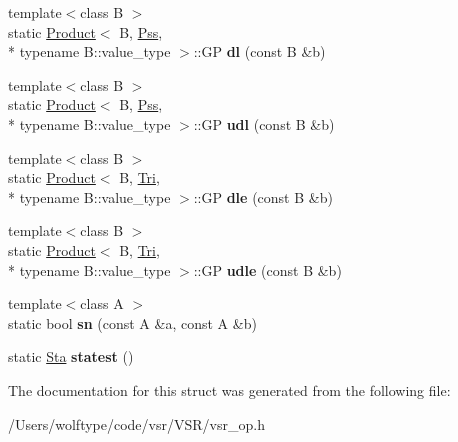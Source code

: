 \begin{DoxyCompactItemize}
\item 
\hypertarget{structvsr_1_1_op_a380263c269adfe2594918b25c3c9cd2c}{{\footnotesize template$<$class B $>$ }\\static \hyperlink{structvsr_1_1_product}{Product}$<$ B, \hyperlink{namespacevsr_ac1470327d90abc4d29ce338b597f4380}{Pss}, \\*
typename B\-::value\-\_\-type $>$\-::G\-P {\bfseries dl} (const B \&b)}\label{structvsr_1_1_op_a380263c269adfe2594918b25c3c9cd2c}

\item 
\hypertarget{structvsr_1_1_op_a43890380a85625a7e080cca922e43b23}{{\footnotesize template$<$class B $>$ }\\static \hyperlink{structvsr_1_1_product}{Product}$<$ B, \hyperlink{namespacevsr_ac1470327d90abc4d29ce338b597f4380}{Pss}, \\*
typename B\-::value\-\_\-type $>$\-::G\-P {\bfseries udl} (const B \&b)}\label{structvsr_1_1_op_a43890380a85625a7e080cca922e43b23}

\item 
\hypertarget{structvsr_1_1_op_aa6f6d3fde873510e7e5b4df1b6a4a3e2}{{\footnotesize template$<$class B $>$ }\\static \hyperlink{structvsr_1_1_product}{Product}$<$ B, \hyperlink{namespacevsr_aba11ef88607d6b99a9f9bff1339db064}{Tri}, \\*
typename B\-::value\-\_\-type $>$\-::G\-P {\bfseries dle} (const B \&b)}\label{structvsr_1_1_op_aa6f6d3fde873510e7e5b4df1b6a4a3e2}

\item 
\hypertarget{structvsr_1_1_op_ab269ab1cbaf1b25b1cf2847a8a5e0435}{{\footnotesize template$<$class B $>$ }\\static \hyperlink{structvsr_1_1_product}{Product}$<$ B, \hyperlink{namespacevsr_aba11ef88607d6b99a9f9bff1339db064}{Tri}, \\*
typename B\-::value\-\_\-type $>$\-::G\-P {\bfseries udle} (const B \&b)}\label{structvsr_1_1_op_ab269ab1cbaf1b25b1cf2847a8a5e0435}

\item 
\hypertarget{structvsr_1_1_op_a8be8c3dd09d25d8f83a6d702db034d6c}{{\footnotesize template$<$class A $>$ }\\static bool {\bfseries sn} (const A \&a, const A \&b)}\label{structvsr_1_1_op_a8be8c3dd09d25d8f83a6d702db034d6c}

\item 
\hypertarget{structvsr_1_1_op_a1efc58c1191bf6d7913dd39578f36c05}{static \hyperlink{namespacevsr_a7cc09af9bea56081667dae983994662d}{Sta} {\bfseries statest} ()}\label{structvsr_1_1_op_a1efc58c1191bf6d7913dd39578f36c05}

\end{DoxyCompactItemize}


The documentation for this struct was generated from the following file\-:\begin{DoxyCompactItemize}
\item 
/\-Users/wolftype/code/vsr/\-V\-S\-R/vsr\-\_\-op.\-h\end{DoxyCompactItemize}
